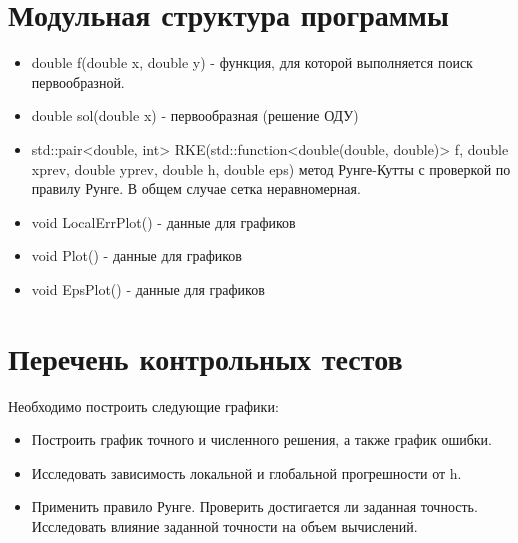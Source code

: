 \documentclass[12pt]{article}
\begin{document}
\section{Модульная структура программы}
\begin{itemize}
    \item double f(double x, double y) - функция, для которой выполняется поиск первообразной.
    \item double sol(double x) - первообразная (решение ОДУ)
    \item std::pair<double, int> RKE(std::function<double(double, double)> f, double xprev, double yprev, double h, double eps) метод Рунге-Кутты с проверкой по правилу Рунге. В общем случае сетка неравномерная.
    \item void LocalErrPlot() - данные для графиков
    \item void Plot() - данные для графиков
    \item void EpsPlot() - данные для графиков
\end{itemize}
\section{Перечень контрольных тестов}
Необходимо построить следующие графики:
\begin{itemize}
    \item Построить график точного и численного решения, а также график ошибки.
    \item Исследовать зависимость локальной и глобальной прогрешности от h.
    \item Применить правило Рунге. Проверить достигается ли заданная точность. Исследовать влияние заданной точности на объем вычислений.
\end{itemize}
\end{document}
